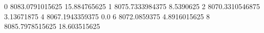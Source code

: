 0 8083.0791015625 15.884765625
1 8075.7333984375 8.5390625
2 8070.3310546875 3.13671875
4 8067.1943359375 0.0
6 8072.0859375 4.8916015625
8 8085.7978515625 18.603515625

